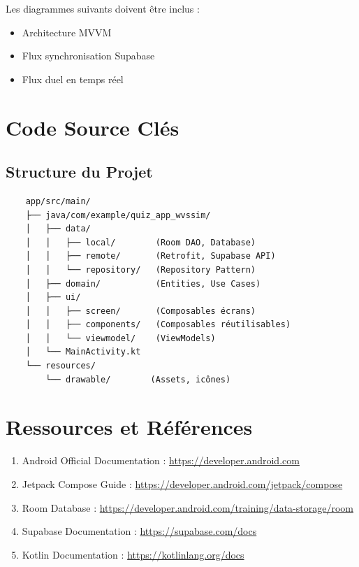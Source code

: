 \documentclass[12pt,a4paper,openany]{report}
\begin{document}
    Les diagrammes suivants doivent être inclus :
    \begin{itemize}
      \item Architecture MVVM
      \item Flux synchronisation Supabase
      \item Flux duel en temps réel
    \end{itemize}

    \chapter{Code Source Clés}

    \section{Structure du Projet}

    \begin{lstlisting}
    app/src/main/
    ├── java/com/example/quiz_app_wvssim/
    │   ├── data/
    │   │   ├── local/        (Room DAO, Database)
    │   │   ├── remote/       (Retrofit, Supabase API)
    │   │   └── repository/   (Repository Pattern)
    │   ├── domain/           (Entities, Use Cases)
    │   ├── ui/
    │   │   ├── screen/       (Composables écrans)
    │   │   ├── components/   (Composables réutilisables)
    │   │   └── viewmodel/    (ViewModels)
    │   └── MainActivity.kt
    └── resources/
        └── drawable/        (Assets, icônes)
    \end{lstlisting}

    \chapter{Ressources et Références}

    \begin{enumerate}
      \item Android Official Documentation : \url{https://developer.android.com}
      \item Jetpack Compose Guide : \url{https://developer.android.com/jetpack/compose}
      \item Room Database : \url{https://developer.android.com/training/data-storage/room}
      \item Supabase Documentation : \url{https://supabase.com/docs}
      \item Kotlin Documentation : \url{https://kotlinlang.org/docs}
    \end{enumerate}

    
\end{document}
